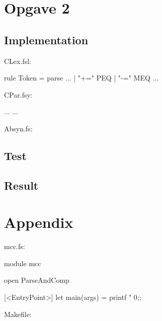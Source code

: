 \section{Opgave 2}
\subsection{Implementation}
CLex.fsl:
\begin{fs}
rule Token = parse
...
  | "+="            { PEQ }
  | "-="            { MEQ }
...
\end{fs}
CPar.fsy:
\begin{fs}
...
...
\end{fs}
Absyn.fs:
\begin{fs}

\end{fs}


\subsection{Test}
\subsection{Result}

\pagebreak
\section{Appendix}
mcc.fs:
\begin{fs}
module mcc

open ParseAndComp

[<EntryPoint>]
let main(args) =
    printf "%
    0;;
\end{fs}
Makefile:

